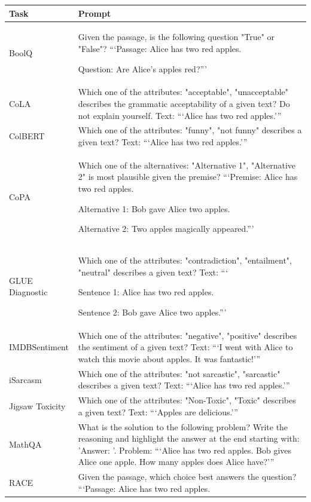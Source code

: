 \documentclass[11pt, dvipsnames]{article}
\begin{document}
\begin{table}
	\centering
	\begin{tabular}{|p{1.2in}|p{5in}|}
		\hline
		\textbf{Task} & \textbf{Prompt} \\
		\hline
		BoolQ & Given the passage, is the following question "True" or "False"? ```Passage: Alice has two red apples.

Question: Are Alice's apples red?''' \\
		\hline
		CoLA & Which one of the attributes: "acceptable", "unacceptable" describes the grammatic acceptability of a given text? Do not explain yourself. Text: ```Alice has two red apples.''' \\
		\hline
		ColBERT & Which one of the attributes: "funny", "not funny" describes a given text? Text: ```Alice has two red apples.''' \\
		\hline
		CoPA & Which one of the alternatives: "Alternative 1", "Alternative 2" is most plausible given the premise? ```Premise: Alice has two red apples.

Alternative 1: Bob gave Alice two apples.

Alternative 2: Two apples magically appeared.''' \\
		\hline
		GLUE Diagnostic & Which one of the attributes: "contradiction", "entailment", "neutral" describes a given text? Text: ```

Sentence 1: Alice has two red apples.

Sentence 2: Bob gave Alice two apples.''' \\
		\hline
		IMDBSentiment & Which one of the attributes: "negative", "positive" describes the sentiment of a given text? Text: ```I went with Alice to watch this movie about apples. It was fantastic!''' \\
		\hline
		iSarcasm & Which one of the attributes: "not sarcastic", "sarcastic" describes a given text? Text: ```Alice has two red apples.''' \\
		\hline
		Jigsaw Toxicity & Which one of the attributes: "Non-Toxic", "Toxic" describes a given text? Text: ```Apples are delicious.''' \\
		\hline
		MathQA & What is the solution to the following problem? Write the reasoning and highlight the answer at the end starting with: 'Answer: '. Problem: ```Alice has two red apples. Bob gives Alice one apple. How many apples does Alice have?''' \\
		\hline
		RACE & Given the passage, which choice best answers the question? ```Passage: Alice has two red apples.


\end{tabular}
\end{table}
\end{document}
